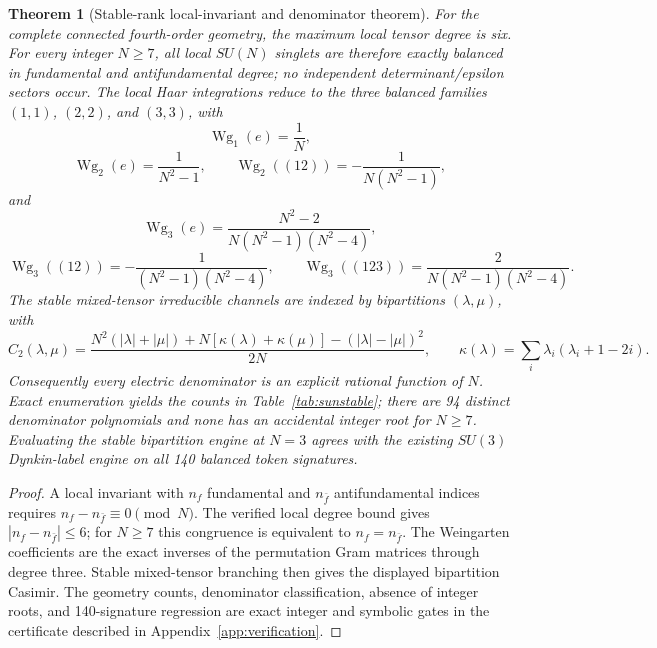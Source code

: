 \documentclass[11pt]{article}
\newtheorem{theorem}{Theorem}[section]
\begin{document}
\begin{theorem}[Stable-rank local-invariant and denominator theorem]
\label{thm:sunstable}
For the complete connected fourth-order geometry, the maximum local tensor
degree is six. For every integer $N\geq7$, all local $SU(N)$ singlets are
therefore exactly balanced in fundamental and antifundamental degree; no
independent determinant/epsilon sectors occur. The local Haar integrations
reduce to the three balanced families $(1,1)$, $(2,2)$, and $(3,3)$, with
\[
\operatorname{Wg}_1(e)=\frac1N,
\]
\[
\operatorname{Wg}_2(e)=\frac1{N^2-1},\qquad
\operatorname{Wg}_2((12))=-\frac1{N(N^2-1)},
\]
and
\[
\operatorname{Wg}_3(e)=\frac{N^2-2}{N(N^2-1)(N^2-4)},
\]
\[
\operatorname{Wg}_3((12))=-\frac1{(N^2-1)(N^2-4)},\qquad
\operatorname{Wg}_3((123))=\frac2{N(N^2-1)(N^2-4)}.
\]
The stable mixed-tensor irreducible channels are indexed by bipartitions
$(\lambda,\mu)$, with
\[
C_2(\lambda,\mu)=
\frac{N^2(|\lambda|+|\mu|)
+N[\kappa(\lambda)+\kappa(\mu)]
-(|\lambda|-|\mu|)^2}{2N},
\qquad
\kappa(\lambda)=\sum_i\lambda_i(\lambda_i+1-2i).
\]
Consequently every electric denominator is an explicit rational function of
$N$. Exact enumeration yields the counts in Table~\ref{tab:sunstable}; there
are 94 distinct denominator polynomials and none has an accidental integer
root for $N\geq7$. Evaluating the stable bipartition engine at $N=3$ agrees
with the existing $SU(3)$ Dynkin-label engine on all 140 balanced token
signatures.
\end{theorem}

\begin{proof}
A local invariant with $n_f$ fundamental and $n_{\bar f}$ antifundamental
indices requires
$n_f-n_{\bar f}\equiv0\pmod N$. The verified local degree bound gives
$|n_f-n_{\bar f}|\leq6$; for $N\geq7$ this congruence is equivalent to
$n_f=n_{\bar f}$. The Weingarten coefficients are the exact inverses of the
permutation Gram matrices through degree three. Stable mixed-tensor branching
then gives the displayed bipartition Casimir. The geometry counts,
denominator classification, absence of integer roots, and 140-signature
regression are exact integer and symbolic gates in the certificate described
in Appendix~\ref{app:verification}.
\end{proof}
\end{document}
